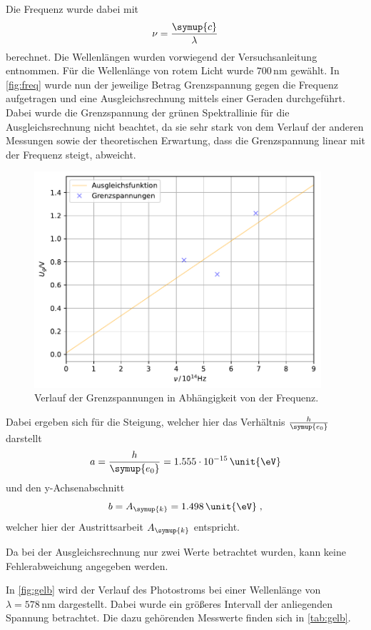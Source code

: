 Die Frequenz wurde dabei mit
\begin{equation*}
    \nu = \frac{\symup{c}}{\lambda}
\end{equation*}
berechnet. Die Wellenlängen wurden vorwiegend der Versuchsanleitung \cite{ap500} entnommen. Für die Wellenlänge von rotem Licht wurde 
$700\,\unit{\nm}$ \cite{rot} gewählt.
In \autoref{fig:freq} wurde nun der jeweilige Betrag Grenzspannung gegen die Frequenz aufgetragen und eine Ausgleichsrechnung mittels einer Geraden
durchgeführt. Dabei wurde die Grenzspannung der grünen Spektrallinie für die Ausgleichsrechnung nicht beachtet, da sie sehr stark von dem Verlauf der 
anderen Messungen sowie der theoretischen Erwartung, dass die Grenzspannung linear mit der Frequenz steigt, abweicht.
\begin{figure}
    \centering
    \includegraphics[height = 8cm]{build/frequenz.pdf}
    \caption{Verlauf der Grenzspannungen in Abhängigkeit von der Frequenz.}
    \label{fig:freq}
\end{figure}
Dabei ergeben sich für die Steigung, welcher hier das Verhältnis $\frac{h}{\symup{e_0}}$ darstellt 
\begin{equation*}
    a = \frac{h}{\symup{e_0}} = 1.555 \cdot 10^{-15} \,\unit{\eV}
\end{equation*}
und den y-Achsenabschnitt
\begin{equation*}
    b = A_{\symup{k}} = 1.498 \,\unit{\eV} \; ,
\end{equation*}
welcher hier der Austrittsarbeit $A_{\symup{k}}$ entspricht.

Da bei der Ausgleichsrechnung nur zwei Werte betrachtet wurden, kann keine Fehlerabweichung angegeben werden.



In \autoref{fig:gelb} wird der Verlauf des Photostroms bei einer Wellenlänge von $\lambda = 578 \,\unit{\nm}$ dargestellt. Dabei wurde ein größeres 
Intervall der anliegenden Spannung betrachtet. Die dazu gehörenden Messwerte finden sich in \autoref{tab:gelb}.

